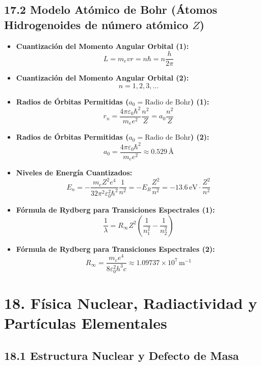 \documentclass[11pt,a4paper]{article}
\begin{document}
\subsection*{17.2 Modelo Atómico de Bohr (Átomos Hidrogenoides de número atómico $Z$)}

\begin{itemize}
  \item \textbf{Cuantización del Momento Angular Orbital (1):}
  \[
    L = m_e v r = n \hbar = n \frac{h}{2\pi}
  \]
  \item \textbf{Cuantización del Momento Angular Orbital (2):}
  \[
    n = 1, 2, 3, \dots
  \]
  \item \textbf{Radios de Órbitas Permitidas ($a_0 = \text{Radio de Bohr}$) (1):}
  \[
    r_n = \frac{4\pi\varepsilon_0 \hbar^2}{m_e e^2} \frac{n^2}{Z} = a_0 \frac{n^2}{Z}
  \]
  \item \textbf{Radios de Órbitas Permitidas ($a_0 = \text{Radio de Bohr}$) (2):}
  \[
    a_0 = \frac{4\pi\varepsilon_0 \hbar^2}{m_e e^2} \approx 0.529 \, \mathrm{Å}
  \]
  \item \textbf{Niveles de Energía Cuantizados:}
  \[
    E_n = -\frac{m_e Z^2 e^4}{32 \pi^2 \varepsilon_0^2 \hbar^2} \frac{1}{n^2} = -E_R \frac{Z^2}{n^2} = -13.6 \, \mathrm{eV} \cdot \frac{Z^2}{n^2}
  \]
  \item \textbf{Fórmula de Rydberg para Transiciones Espectrales (1):}
  \[
    \frac{1}{\lambda} = R_\infty Z^2 \left( \frac{1}{n_1^2} - \frac{1}{n_2^2} \right)
  \]
  \item \textbf{Fórmula de Rydberg para Transiciones Espectrales (2):}
  \[
    R_\infty = \frac{m_e e^4}{8 \varepsilon_0^2 h^3 c} \approx 1.09737 \times 10^7 \, \mathrm{m}^{-1}
  \]
\end{itemize}

\section*{18. Física Nuclear, Radiactividad y Partículas Elementales}

\subsection*{18.1 Estructura Nuclear y Defecto de Masa}
\end{document}
